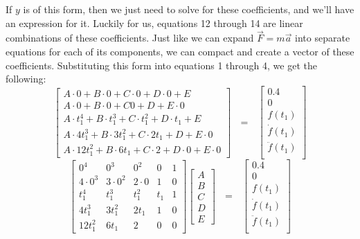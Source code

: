 \documentclass[nofoot,pdf-a,balance,colorlinks,upint,subscriptcorrection,varvw,mathalfa=cal=boondoxo]{asmeconf}
\begin{document}
    If $y$ is of this form, then we just need to solve for these coefficients, and we'll have an expression for it. Luckily for us, equations 12 through 14 are linear combinations of these coefficients. Just like we can expand $\vec{F} = m \vec{a}$ into separate equations for each of its components, we can compact and create a vector of these coefficients. Substituting this form into equations 1 through 4, we get the following:
    \begin{equation}
        \begin{bmatrix}
            A \cdot 0 + B\cdot 0 + C\cdot 0 + D\cdot 0 + E \\
            A \cdot 0 + B\cdot 0 + C  0 + D + E \cdot 0 \\
            A \cdot  t_1^4 + B\cdot  t_1^3 + C\cdot  t_1^2 + D\cdot  t_1 + E \\
            A \cdot  4t_1^3 + B\cdot  3t_1^2 + C \cdot  2t_1 + D + E \cdot  0 \\
            A\cdot 12t_1^2 + B\cdot  6t_1 + C \cdot  2 + D\cdot 0 + E\cdot  0
        \end{bmatrix} \textrm{ } = \textrm{ }  
        \begin{bmatrix}
            0.4 \\ 
            0 \\
            f\left(t_1\right) \\
            \dot{f}\left(t_1\right) \\
            \ddot{f}\left(t_1\right) \\
        \end{bmatrix}
    \end{equation}
    \begin{equation}
        \begin{bmatrix}
            0^4 & 0^3 & 0^2 & 0 & 1 \\
            4\cdot 0^3 & 3\cdot 0^2 & 2\cdot 0 & 1 & 0 \\
            t_1^4 & t_1^3 & t_1^2 & t_1 & 1 \\
            4t_1^3 & 3t_1^2 & 2t_1 & 1 & 0 \\
            12t_1^2 & 6t_1 & 2 & 0 & 0
        \end{bmatrix}
        \begin{bmatrix}
            A \\
            B \\ 
            C \\ 
            D \\ 
            E 
        \end{bmatrix}
        \textrm{ } = \textrm{ }  
        \begin{bmatrix}
            0.4 \\ 
            0 \\
            f\left(t_1\right) \\
            \dot{f}\left(t_1\right) \\
            \ddot{f}\left(t_1\right) \\
        \end{bmatrix}
    \end{equation}
\end{document}

